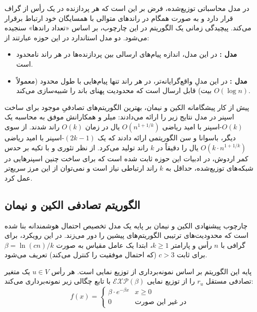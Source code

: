\documentclass[11pt,a4paper]{report}
\theoremstyle{plain}
\theoremstyle{definition}
\theoremstyle{remark}
\begin{document}
در مدل محاسباتی توزیع‌شده، فرض بر این است که هر پردازنده در یک رأس از گراف قرار دارد و به صورت همگام در راندهای متوالی با همسایگان خود ارتباط برقرار می‌کند. پیچیدگی زمانی یک الگوریتم در این چارچوب، بر اساس «تعداد راندها» سنجیده می‌شود. دو مدل استاندارد در این حوزه عبارتند از:

\begin{itemize}
    \item \textbf{مدل :} در این مدل، اندازه پیام‌های ارسالی بین پردازنده‌ها در هر راند نامحدود است.
    \item \textbf{مدل :} در این مدلِ واقع‌گرایانه‌تر، در هر راند تنها پیام‌هایی با طول محدود (معمولاً $O(\log n)$ بیت) قابل ارسال است که محدودیت پهنای باند را شبیه‌سازی می‌کند.
\end{itemize}

پیش از کار پیشگامانه الکین و نیمان، بهترین الگوریتم‌های تصادفیِ موجود برای ساخت اسپنر در مدل  نتایج زیر را ارائه می‌دادند: میلر و همکارانش \cite{miller2015improved} موفق به محاسبه یک $O(k)$-اسپنر با امید ریاضی $O(n^{1+1/k})$ یال در زمان $O(k)$ راند شدند. از سوی دیگر، باسوانا و سن \cite{baswana2007simple} الگوریتمی ارائه دادند که یک $(2k-1)$-اسپنر با امید ریاضی $O(k \cdot n^{1+1/k})$ یال را دقیقاً در $k$ راند تولید می‌کرد. از نظر تئوری و با تکیه بر حدس کمر اردوش، در ادبیات این حوزه ثابت شده است که برای ساخت چنین اسپنرهایی در شبکه‌های توزیع‌شده، حداقل به $k$ راند ارتباطی نیاز است و نمی‌توان از این مرز سریع‌تر عمل کرد.

\subsection{الگوریتم تصادفی الکین و نیمان}
چارچوب پیشنهادی الکین و نیمان \cite{elkin2019efficient} بر پایه یک مدل تخصیص احتمال هوشمندانه بنا شده است که محدودیت‌های ترتیبی الگوریتم‌های پیشین را دور می‌زند. در این رویکرد، برای گرافی با $n$ رأس و پارامتر $k \ge 1$، ابتدا یک عامل مقیاس به صورت $\beta = \ln(cn)/k$ برای ثابت $c > 3$ (که احتمال موفقیت را کنترل می‌کند) تعریف می‌شود. 

پایه این الگوریتم بر اساس نمونه‌برداری از توزیع نمایی است. هر رأس $u \in V$ یک متغیر تصادفی مستقل $r_u$ را از توزیع نمایی $\mathcal{EXP}(\beta)$ با تابع چگالی زیر نمونه‌برداری می‌کند:
\[ 
f(x) = \begin{cases} 
\beta \cdot e^{-\beta x} & x \ge 0 \\ 
0 & \text{در غیر این صورت} 
\end{cases} 
\]
\end{document}
